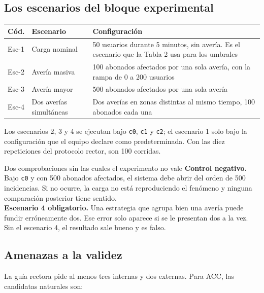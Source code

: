 \documentclass[11pt,a4paper]{article}
\begin{document}
\subsection{Los escenarios del bloque experimental}

\begin{center}
	\small
	\begin{tabular}{@{}p{1.3cm}p{5.4cm}p{8.3cm}@{}}
		\toprule
		\textbf{Cód.} & \textbf{Escenario} & \textbf{Configuración} \\
		\midrule
		Esc-1 & Carga nominal & 50 usuarios durante 5 minutos, sin avería. Es el escenario que la Tabla 2 usa para los umbrales \\
		\addlinespace
		Esc-2 & Avería masiva & 100 abonados afectados por una sola avería, con la rampa de 0 a 200 usuarios \\
		\addlinespace
		Esc-3 & Avería mayor & 500 abonados afectados por una sola avería \\
		\addlinespace
		Esc-4 & Dos averías simultáneas & Dos averías en zonas distintas al mismo tiempo, 100 abonados cada una \\
		\bottomrule
	\end{tabular}
\end{center}

Los escenarios 2, 3 y 4 se ejecutan bajo \texttt{c0}, \texttt{c1} y \texttt{c2}; el escenario 1 solo bajo la configuración que el equipo declare como predeterminada. Con las diez repeticiones del protocolo rector, son 100 corridas.

\begin{pisoBox}{Dos comprobaciones sin las cuales el experimento no vale}
	\textbf{Control negativo.} Bajo \texttt{c0} y con 500 abonados afectados, el sistema debe abrir del orden de 500 incidencias. Si no ocurre, la carga no está reproduciendo el fenómeno y ninguna comparación posterior tiene sentido.\\[5pt]
	\textbf{Escenario 4 obligatorio.} Una estrategia que agrupa bien una avería puede fundir erróneamente dos. Ese error solo aparece si se le presentan dos a la vez. Sin el escenario 4, el resultado sale bueno y es falso.
\end{pisoBox}

\subsection{Amenazas a la validez}

La guía rectora pide al menos tres internas y dos externas. Para ACC, las candidatas naturales son:
\end{document}
